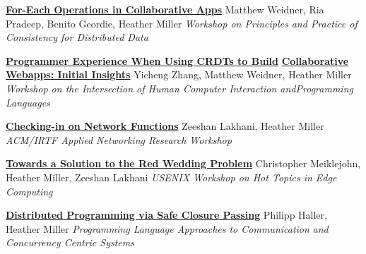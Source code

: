 \documentclass[9pt]{article}
\begin{document}

\noindent\href{https://dl.acm.org/doi/10.1145/3578358.3591323}{\bf For-Each Operations in Collaborative Apps}
\newline\noindent Matthew Weidner, Ria Pradeep, Benito Geordie, Heather Miller
\newline\noindent\emph{Workshop on Principles and Practice of Consistency for Distributed Data}
\bigskip

\noindent\href{https://kilthub.cmu.edu/articles/conference_contribution/Programmer_Experience_When_Using_CRDTs_to_Build_Collaborative_Webapps_Initial_Insights/22277341/1}{\bf Programmer Experience When Using CRDTs to Build}\vspace{-0.03in}
\newline\noindent\href{https://kilthub.cmu.edu/articles/conference_contribution/Programmer_Experience_When_Using_CRDTs_to_Build_Collaborative_Webapps_Initial_Insights/22277341/1}{\bf Collaborative Webapps: Initial Insights}
\newline\noindent Yicheng Zhang, Matthew Weidner, Heather Miller
\newline\noindent\emph{Workshop on the Intersection of Human Computer Interaction and}\vspace{-0.03in}\newline\noindent\emph{Programming Languages}
\bigskip

\noindent\href{https://dl.acm.org/citation.cfm?id=3341131}{\bf Checking-in on Network Functions}
\newline\noindent Zeeshan Lakhani, Heather Miller
\newline\noindent\emph{ACM/IRTF Applied Networking Research Workshop}
\bigskip

\noindent\href{https://www.usenix.org/system/files/conference/hotedge18/hotedge18-papers-meiklejohn.pdf}{\bf Towards a Solution to the Red Wedding Problem}
\newline\noindent Christopher Meiklejohn, Heather Miller, Zeeshan Lakhani
\newline\noindent\emph{USENIX Workshop on Hot Topics in Edge Computing}
\bigskip

\noindent\href{https://infoscience.epfl.ch/record/205039}{\bf Distributed Programming via Safe Closure Passing}
\newline\noindent Philipp Haller, Heather Miller
\newline\noindent\emph{Programming Language Approaches to Communication}
\newline\noindent\emph{and Concurrency Centric Systems}
\bigskip
\end{document}
